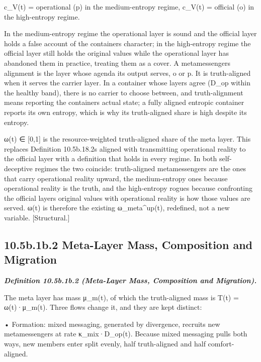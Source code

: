 \documentclass[
]{article}
\begin{document}
c\_V(t) = operational (p) in the medium-entropy regime, c\_V(t) =
official (o) in the high-entropy regime.

In the medium-entropy regime the operational layer is sound and the
official layer holds a false account of the container\textquotesingle s
character; in the high-entropy regime the official layer still holds the
original values while the operational layer has abandoned them in
practice, treating them as a cover. A metamessenger\textquotesingle s
alignment is the layer whose agenda its output serves, o or p. It is
truth-aligned when it serves the carrier layer. In a container whose
layers agree (D\_op within the healthy band), there is no carrier to
choose between, and truth-alignment means reporting the
container\textquotesingle s actual state; a fully aligned entropic
container reports its own entropy, which is why its truth-aligned share
is high despite its entropy.

ω(t) ∈ {[}0,1{]} is the resource-weighted truth-aligned share of the
meta layer. This replaces Definition 10.5b.18.2\textquotesingle s
\textquotesingle aligned with transmitting operational reality to the
official layer\textquotesingle{} with a definition that holds in every
regime. In both self-deceptive regimes the two coincide: truth-aligned
metamessengers are the ones that carry operational reality upward, the
medium-entropy ones because operational reality is the truth, and the
high-entropy rogues because confronting the official
layer\textquotesingle s original values with operational reality is how
those values are served. ω(t) is therefore the existing
ω\_meta\^{}up(t), redefined, not a new variable. {[}Structural.{]}

\hypertarget{b.1b.2-meta-layer-mass-composition-and-migration}{%
\subsection{10.5b.1b.2 Meta-Layer Mass, Composition and
Migration}\label{b.1b.2-meta-layer-mass-composition-and-migration}}

\emph{\textbf{Definition 10.5b.1b.2 (Meta-Layer Mass, Composition and
Migration).}}

The meta layer has mass μ\_m(t), of which the truth-aligned mass is T(t)
= ω(t)·μ\_m(t). Three flows change it, and they are kept distinct:

• Formation: mixed messaging, generated by divergence, recruits new
metamessengers at rate κ\_mix·D\_op(t). Because mixed messaging pulls
both ways, new members enter split evenly, half truth-aligned and half
comfort-aligned.
\end{document}
